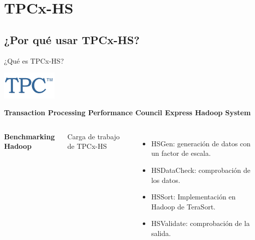 \section{TPCx-HS}

	\subsection*{¿Por qué usar TPCx-HS?}

		\begin{frame}{¿Qué es TPCx-HS?}
			\kern -10mm
			\begin{flushright}
					\includegraphics[width=0.2\textwidth]{./Images/tpc-logo.png}
			\end{flushright}
			\kern -2mm
			\begin{tcolorbox}[colback=ChetwodeBlue!10,colframe=ChetwodeBlue!60]
				\fontsize{8}{8}\selectfont
				\centering
				\textbf{Transaction Processing Performance Council Express Hadoop System}
			\end{tcolorbox}

			\begin{columns}[c]
					\kern-2mm
					\begin{center}
						{\color{TurkishRose}\large \textbf{Benchmarking Hadoop}}						
					\end{center}
					
					\kern 3mm

					{\color{ChetwodeBlue}\large Carga de trabajo de TPCx-HS}		
					\begin{itemize}
						\fontsize{8}{10}\selectfont
						\item HSGen: generación de datos con un factor de escala.
						\item HSDataCheck: comprobación de los datos.
						\item HSSort: Implementación en Hadoop de TeraSort.
						\item HSValidate: comprobación de la salida.
					\end{itemize}		
			

\end{columns}
\end{frame}
